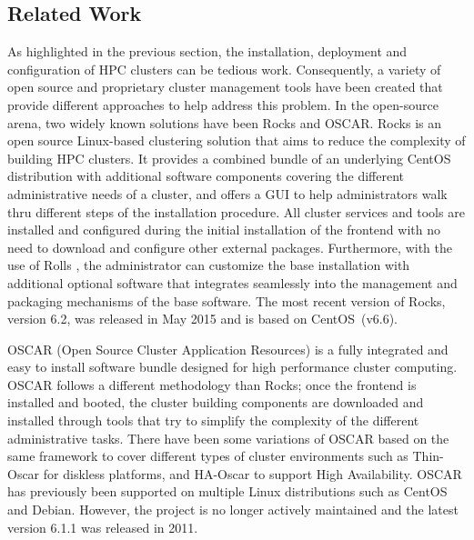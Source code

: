 \subsection{Related Work} \label{sec:related_work}

As highlighted in the previous section, the installation, deployment and
configuration of HPC clusters can be tedious work.  Consequently, a variety of
open source and proprietary cluster management tools have been created that
provide different approaches to help address this problem.  In the open-source
arena, two widely known solutions have been Rocks and OSCAR.  Rocks
\cite{rocks2003,rocks_url} is an open source Linux-based clustering solution
that aims to reduce the complexity of building HPC clusters.  It provides a
combined bundle of an underlying CentOS distribution with additional software
components covering the different administrative needs of a cluster, 
and offers a GUI to help administrators walk thru
different steps of the installation procedure.  All cluster services and tools
are installed and configured during the initial installation of the frontend
with no need to download and %
configure other external
packages. Furthermore, with the use of Rolls \cite{rolls2004}, the
administrator can customize the base installation
with additional
optional software that integrates seamlessly
into the management and
packaging mechanisms of the base software.
The most recent version of Rocks, version 6.2, was released in May 2015 and is
based on CentOS~(v6.6).

OSCAR \cite{oscar2001,oscar_url} (Open Source Cluster Application Resources) is
a fully integrated and easy to install software bundle designed for high
performance cluster computing.
OSCAR follows a different methodology than Rocks; once
the frontend is installed and booted, the cluster building components are
downloaded and installed through tools that try to simplify the complexity of
the different administrative tasks.  There have been some variations of OSCAR
based on the same framework to cover different types of cluster environments
such as Thin-Oscar for diskless platforms, and HA-Oscar to support High
Availability. OSCAR has previously been supported on multiple Linux distributions such as
CentOS and Debian. However,
the project is no longer actively maintained and the latest
version 6.1.1 was released in 2011.


